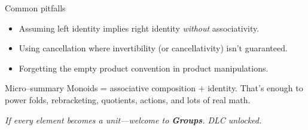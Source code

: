 \documentclass[aspectratio=169,11pt]{beamer}
\newcommand{\tline}[1]{\par\medskip\textcolor{transit}{\emph{#1}}\par\medskip}
\begin{document}
\begin{frame}{Common pitfalls}
\begin{itemize}
  \item Assuming left identity implies right identity \emph{without} associativity.
  \item Using cancellation where invertibility (or cancellativity) isn’t guaranteed.
  \item Forgetting the empty product convention in product manipulations.
\end{itemize}
\begin{block}{Micro–summary}
Monoids = associative composition $+$ identity. That’s enough to power folds, rebracketing, quotients, actions, and lots of real math.
\end{block}
\tline{If every element becomes a unit—welcome to \textbf{Groups}. DLC unlocked.}
\end{frame}
\end{document}
